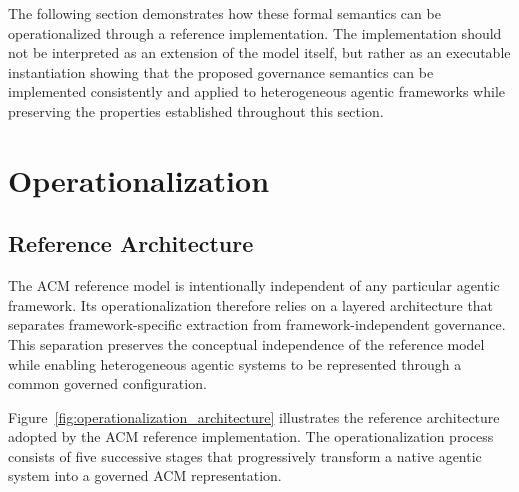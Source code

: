 \documentclass[10pt]{article}
\begin{document}
The following section demonstrates how these formal semantics can be
operationalized through a reference implementation. The implementation should
not be interpreted as an extension of the model itself, but rather as an
executable instantiation showing that the proposed governance semantics can be
implemented consistently and applied to heterogeneous agentic frameworks while
preserving the properties established throughout this section.

\section{Operationalization}
\label{sec:operationalization}
\subsection{Reference Architecture}

The ACM reference model is intentionally independent of any particular agentic framework. Its operationalization therefore relies on a layered architecture that separates framework-specific extraction from framework-independent governance. This separation preserves the conceptual independence of the reference model while enabling heterogeneous agentic systems to be represented through a common governed configuration.

Figure~\ref{fig:operationalization_architecture} illustrates the reference architecture adopted by the ACM reference implementation. The operationalization process consists of five successive stages that progressively transform a native agentic system into a governed ACM representation.

%
\end{document}
